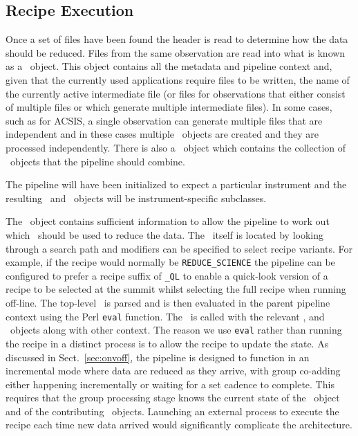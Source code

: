 \documentclass[final,authoryear,5p,times,twocolumn]{elsarticle}
\newcommand*\secref[1]{Sect.~\ref{#1}}
\begin{document}
\subsection{Recipe Execution}
\label{sec:exec}

Once a set of files have been found the header is read to determine
how the data should be reduced. Files from the same observation are
read into what is known as a \Frame\ object. This object contains all
the metadata and pipeline context and, given that the currently used
applications require files to be written, the name of the
currently active intermediate file (or files for observations that
either consist of multiple files or which generate multiple
intermediate files). In some cases, such as for ACSIS, a single
observation can generate multiple files that are independent and in
these cases multiple \Frame\ objects are created and they are
processed independently. There is also a \Group\ object which
contains the collection of \Frame\ objects that the pipeline should
combine.

The pipeline will have been initialized to expect a particular instrument and
the resulting \Frame\ and \Group\ objects will be instrument-specific subclasses.

The \Frame\ object contains sufficient information to allow the
pipeline to work out which \recipe\ should be used to reduce the
data. The \recipe\ itself is located by looking through a search path
and modifiers can be specified to select recipe variants. For example,
if the recipe would normally be \texttt{REDUCE\_SCIENCE} the pipeline
can be configured to prefer a recipe suffix of \texttt{\_QL} to
enable a quick-look version of a recipe to be selected at the summit
whilst selecting the full recipe when running off-line.
The top-level \recipe\ is parsed and is then evaluated in the
parent pipeline context using the Perl \texttt{eval} function. The
\recipe\ is called with the relevant \Frame, and \Group\ objects along
with other context. The
reason we use \texttt{eval} rather than running the recipe in a
distinct process is to allow the recipe to update the state. As
discussed in \secref{sec:onvoff}, the pipeline is designed to
function in an incremental mode where data are reduced as they arrive,
with group co-adding either happening incrementally or waiting for a
set cadence to complete. This requires that the group processing stage
knows the current state of the \Group\ object and of the contributing
\Frame\ objects. Launching an external process to execute the
recipe each time new data arrived would significantly complicate the
architecture.
\end{document}
